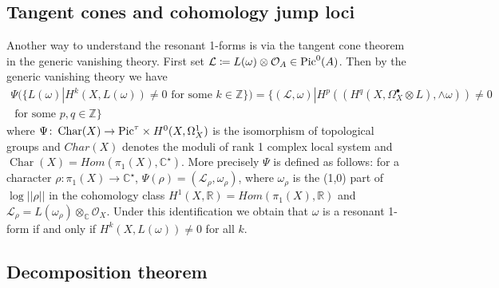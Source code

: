\documentclass[11pt,reqno]{amsart}
\theoremstyle{definition}
\theoremstyle{remark}
\theoremstyle{cited}
\theoremstyle{citeddef}
\DeclareMathOperator{\Char}{Char}
\def\Pic{{\rm Pic}}
\newcommand{\sL}{\mathcal{L}}
\newcommand{\sM}{\mathcal{M}}
\newcommand{\sO}{\mathcal{O}}
\newcommand{\sR}{\mathcal{R}}
\newcommand{\bbC}{\mathbb{C}}
\newcommand{\bbR}{\mathbb{R}}
\newcommand{\bbZ}{\mathbb{Z}}
\begin{document}
\subsection{Tangent cones and cohomology jump loci}
\label{sub:tc} Another way to understand the resonant 1-forms is via the tangent cone theorem in the
generic vanishing theory. 
First set $\sL \coloneqq L(\omega)\otimes \sO_A \in \Pic^0(A)$. 
Then by the generic vanishing theory \cite[Theorem 3]{Ara} we have 
\begin{equation}\begin{split}
\Psi(\{L(\omega)| H^k(X, L(\omega))\neq 0 \text{ for some } k\in \bbZ\})
=\{(\sL,\omega)| H^p((H^q(X,\Omega_X^{\bullet}\otimes L),\wedge\omega)) \neq 0
\\ \text{ for some } p,q\in\bbZ\}
\end{split}\label{eq:}
\end{equation}
where $\Psi \colon\Char(X) \to \Pic^{\tau}\times H^0(X,\Omega_X^1)$ 
is the isomorphism of topological groups and $Char(X)$ denotes the moduli
of rank 1 complex local system and $\Char(X) = Hom(\pi_1(X),\bbC^{\star})$. More precisely $\Psi$ is defined
as follows: for a character $\rho\colon \pi_1(X)\to \bbC^{\star}$, $\Psi(\rho) = (\sL_{\rho} , \omega_{\rho})$, where 
$\omega_\rho$ is the (1,0) part of $\log ||\rho||$ in the cohomology class $H^1(X, \bbR) = Hom(\pi_1(X), \bbR)$ and
$\sL_{\rho} = L(\omega_{\rho})\otimes_{\bbC}\sO_X$.
Under this identification we obtain that $\omega$ is a resonant 1-form if and only if $H^k(X, L(\omega))\neq 0$ for all $k$. 


\subsection{Decomposition theorem}
\end{document}
